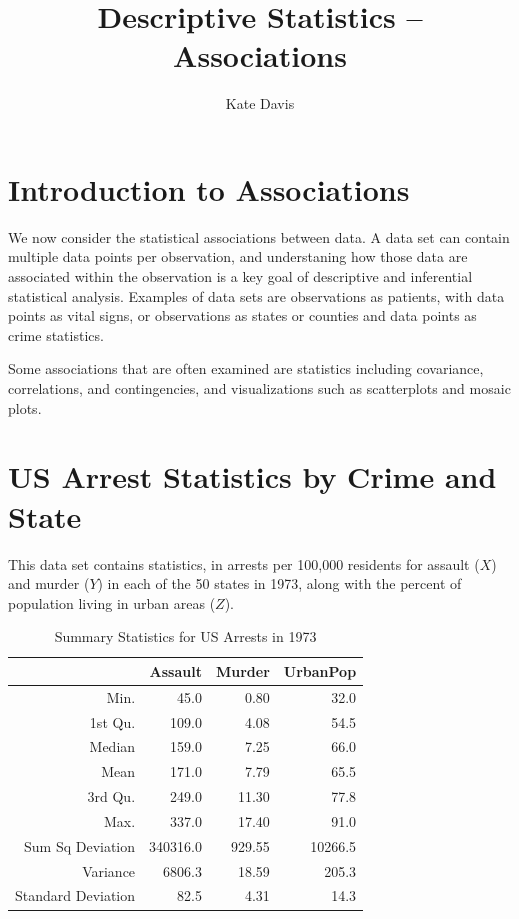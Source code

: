 \documentclass[nohyper,justified]{tufte-handout}\usepackage[]{graphicx}\usepackage[]{color}
\title{Descriptive Statistics -- Associations}
\author{Kate Davis}
\begin{document}
\maketitle
\section{Introduction to Associations}
We now consider the statistical associations between data. A data set can contain multiple data points per observation, and understaning how those data are associated within the observation is a key goal of descriptive and inferential statistical analysis. Examples of data sets are observations as patients, with data points as vital signs, or observations as states or counties and data points as crime statistics. 

Some associations that are often examined are statistics including covariance, correlations, and contingencies, and visualizations such as scatterplots and mosaic plots.

\section{US Arrest Statistics by Crime and State}
This data set contains statistics, in arrests per 100,000 residents for assault ($X$) and murder ($Y$) in each of the 50 states in 1973, along with the percent of population living in urban areas ($Z$).


\begin{table}[ht]
\centering
\begin{tabular}{rrrr}
  \hline
 & Assault & Murder & UrbanPop \\ 
  \hline
Min. & 45.0 & 0.80 & 32.0 \\ 
  1st Qu. & 109.0 & 4.08 & 54.5 \\ 
  Median & 159.0 & 7.25 & 66.0 \\ 
  Mean & 171.0 & 7.79 & 65.5 \\ 
  3rd Qu. & 249.0 & 11.30 & 77.8 \\ 
  Max. & 337.0 & 17.40 & 91.0 \\ 
  Sum Sq Deviation & 340316.0 & 929.55 & 10266.5 \\ 
  Variance & 6806.3 & 18.59 & 205.3 \\ 
  Standard Deviation & 82.5 & 4.31 & 14.3 \\ 
   \hline
\end{tabular}
\caption{Summary Statistics for US Arrests in 1973 } 
\end{table}
\end{document}
